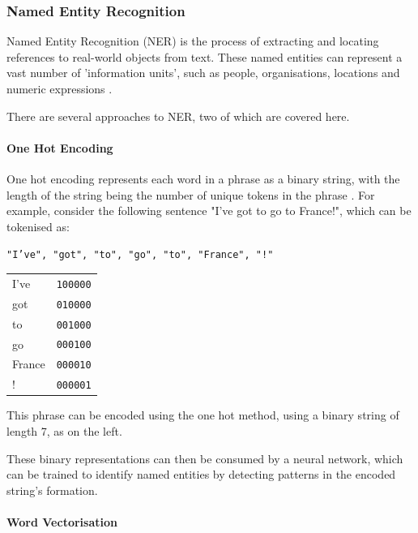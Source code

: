 \subsubsection{Named Entity Recognition}
Named Entity Recognition (NER) is the process of extracting and locating references to real-world objects from text. These named entities can represent a vast number of 'information units', such as people, organisations, locations and numeric expressions \cite{nadeau2007}. 

There are several approaches to NER, two of which are covered here.

\paragraph{One Hot Encoding}
One hot encoding represents each word in a phrase as a binary string, with the length of the string being the number of unique tokens in the phrase \cite{bommana2019}.  For example, consider the following sentence "I've got to go to France!", which can be tokenised as:
\begin{center}\texttt{"I've", "got", "to", "go", "to", "France", "!"}
\end{center}

\begin{minipage}{0.25\textwidth}
\begin{tabular}{ll}
I've   & \texttt{100000} \\
got	   & \texttt{010000} \\
to	   & \texttt{001000} \\  
go 	   & \texttt{000100} \\  
France & \texttt{000010} \\  
!	   & \texttt{000001} \\  
\end{tabular}
\end{minipage}
\begin{minipage}{0.68\textwidth}
This phrase can be encoded using the one hot method, using a binary string of length 7, as on the left.

These binary representations can then be consumed by a neural network, which can be trained to identify named entities by detecting patterns in the encoded string's formation.

\end{minipage}

\paragraph{Word Vectorisation}\label{lit:word2vec}

